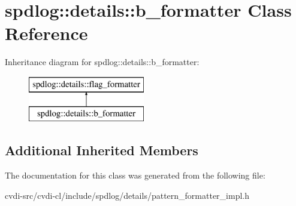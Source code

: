 \hypertarget{classspdlog_1_1details_1_1b__formatter}{}\section{spdlog\+:\+:details\+:\+:b\+\_\+formatter Class Reference}
\label{classspdlog_1_1details_1_1b__formatter}
Inheritance diagram for spdlog\+:\+:details\+:\+:b\+\_\+formatter\+:\begin{figure}[H]
\begin{center}
\leavevmode
\includegraphics[height=2.000000cm]{classspdlog_1_1details_1_1b__formatter}
\end{center}
\end{figure}
\subsection*{Additional Inherited Members}


The documentation for this class was generated from the following file\+:\begin{DoxyCompactItemize}
\item 
cvdi-\/src/cvdi-\/cl/include/spdlog/details/pattern\+\_\+formatter\+\_\+impl.\+h\end{DoxyCompactItemize}
